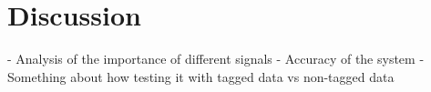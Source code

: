 \chapter{Discussion}
- Analysis of the importance of different signals
- Accuracy of the system 
- Something about how testing it with tagged data vs non-tagged data